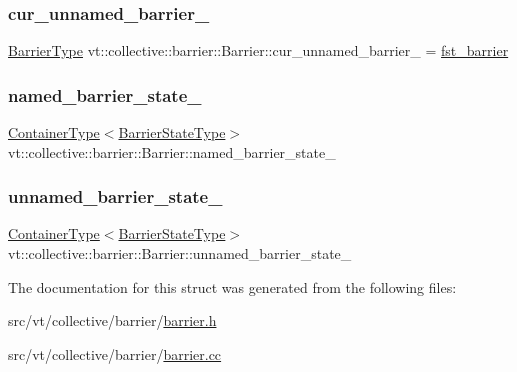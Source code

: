 \subsubsection{\texorpdfstring{cur\+\_\+unnamed\+\_\+barrier\+\_\+}{cur\_unnamed\_barrier\_}}
{\footnotesize\ttfamily \hyperlink{namespacevt_a25e481f0d6bbc7204db23d1c87a62e77}{Barrier\+Type} vt\+::collective\+::barrier\+::\+Barrier\+::cur\+\_\+unnamed\+\_\+barrier\+\_\+ = \hyperlink{namespacevt_1_1collective_1_1barrier_a43d35d830e81f62b5dfb571ce5e0939e}{fst\+\_\+barrier}\hspace{0.3cm}{\ttfamily [private]}}

\mbox{\label{structvt_1_1collective_1_1barrier_1_1_barrier_ae5a50600bf815ba049915d93bc48b727}} 
\subsubsection{\texorpdfstring{named\+\_\+barrier\+\_\+state\+\_\+}{named\_barrier\_state\_}}
{\footnotesize\ttfamily \hyperlink{structvt_1_1collective_1_1barrier_1_1_barrier_a84bfbd26a48a1c3bb7272e81245e4873}{Container\+Type}$<$\hyperlink{structvt_1_1collective_1_1barrier_1_1_barrier_a9b612818f7b44ca65f2caee0dee094f3}{Barrier\+State\+Type}$>$ vt\+::collective\+::barrier\+::\+Barrier\+::named\+\_\+barrier\+\_\+state\+\_\+\hspace{0.3cm}{\ttfamily [private]}}

\mbox{\label{structvt_1_1collective_1_1barrier_1_1_barrier_a83ad5a95d40a7cfcff7782dbc461fb1c}} 
\subsubsection{\texorpdfstring{unnamed\+\_\+barrier\+\_\+state\+\_\+}{unnamed\_barrier\_state\_}}
{\footnotesize\ttfamily \hyperlink{structvt_1_1collective_1_1barrier_1_1_barrier_a84bfbd26a48a1c3bb7272e81245e4873}{Container\+Type}$<$\hyperlink{structvt_1_1collective_1_1barrier_1_1_barrier_a9b612818f7b44ca65f2caee0dee094f3}{Barrier\+State\+Type}$>$ vt\+::collective\+::barrier\+::\+Barrier\+::unnamed\+\_\+barrier\+\_\+state\+\_\+\hspace{0.3cm}{\ttfamily [private]}}



The documentation for this struct was generated from the following files\+:\begin{DoxyCompactItemize}
\item 
src/vt/collective/barrier/\hyperlink{barrier_8h}{barrier.\+h}\item 
src/vt/collective/barrier/\hyperlink{barrier_8cc}{barrier.\+cc}\end{DoxyCompactItemize}
